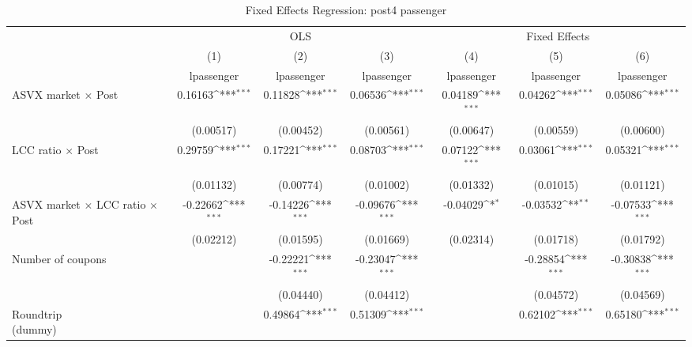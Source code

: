 \begin{table}[htbp]\centering
\def\sym#1{\ifmmode^{#1}\else\(^{#1}\)\fi}
\caption{Fixed Effects Regression: post4 passenger}
\begin{tabular}{l*{6}{c}}
\toprule
                    &\multicolumn{3}{c}{OLS}                                          &\multicolumn{3}{c}{Fixed Effects}                                \\\cmidrule(lr){2-4}\cmidrule(lr){5-7}
                    &\multicolumn{1}{c}{(1)}&\multicolumn{1}{c}{(2)}&\multicolumn{1}{c}{(3)}&\multicolumn{1}{c}{(4)}&\multicolumn{1}{c}{(5)}&\multicolumn{1}{c}{(6)}\\
                    &\multicolumn{1}{c}{lpassenger}&\multicolumn{1}{c}{lpassenger}&\multicolumn{1}{c}{lpassenger}&\multicolumn{1}{c}{lpassenger}&\multicolumn{1}{c}{lpassenger}&\multicolumn{1}{c}{lpassenger}\\
\midrule
ASVX market $\times$ Post&     0.16163\sym{***}&     0.11828\sym{***}&     0.06536\sym{***}&     0.04189\sym{***}&     0.04262\sym{***}&     0.05086\sym{***}\\
                    &   (0.00517)         &   (0.00452)         &   (0.00561)         &   (0.00647)         &   (0.00559)         &   (0.00600)         \\
\addlinespace
LCC ratio $\times$ Post&     0.29759\sym{***}&     0.17221\sym{***}&     0.08703\sym{***}&     0.07122\sym{***}&     0.03061\sym{***}&     0.05321\sym{***}\\
                    &   (0.01132)         &   (0.00774)         &   (0.01002)         &   (0.01332)         &   (0.01015)         &   (0.01121)         \\
\addlinespace
ASVX market $\times$ LCC ratio $\times$ Post&    -0.22662\sym{***}&    -0.14226\sym{***}&    -0.09676\sym{***}&    -0.04029\sym{*}  &    -0.03532\sym{**} &    -0.07533\sym{***}\\
                    &   (0.02212)         &   (0.01595)         &   (0.01669)         &   (0.02314)         &   (0.01718)         &   (0.01792)         \\
\addlinespace
Number of coupons   &                     &    -0.22221\sym{***}&    -0.23047\sym{***}&                     &    -0.28854\sym{***}&    -0.30838\sym{***}\\
                    &                     &   (0.04440)         &   (0.04412)         &                     &   (0.04572)         &   (0.04569)         \\
\addlinespace
\shortstack{Roundtrip \\ (dummy)}&                     &     0.49864\sym{***}&     0.51309\sym{***}&                     &     0.62102\sym{***}&     0.65180\sym{***}\\

\end{tabular}
\end{table}
